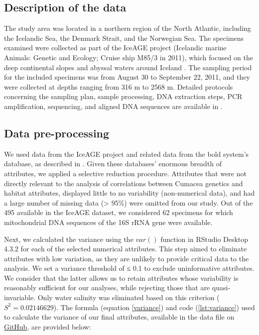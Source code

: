 \subsection{Description of the data}
The study area was located in a northern region of the North Atlantic, including the Icelandic Sea, the Denmark Strait, and the Norwegian Sea. The specimens examined were collected as part of the IceAGE project (Icelandic marine Animals: Genetic and Ecology; Cruise ship M85/3 in 2011), which focused on the deep continental slopes and abyssal waters around Iceland \citep{meisner_prefacebiodiversity_2018}. The sampling period for the included specimens was from August 30 to September 22, 2011, and they were collected at depths ranging from 316 m to 2568 m. Detailed protocols concerning the sampling plan, sample processing, DNA extraction steps, PCR amplification, sequencing, and aligned DNA sequences are available in \citep{uhlir_adding_2021}.

\subsection{Data pre-processing}
We used data from the IceAGE project and related data from the bold system's database, as described in \citep{uhlir_adding_2021}. Given these databases' enormous breadth of attributes, we applied a selective reduction procedure. Attributes that were not directly relevant to the analysis of correlations between Cumacea genetics and habitat attributes, displayed little to no variability (non-numerical data), and had a large number of missing data (> 95\%) were omitted from our study. Out of the 495 available in the IceAGE dataset, we considered 62 specimens for which mitochondrial DNA sequences of the 16S rRNA gene were available. 

Next, we calculated the variance using the $var()$ function in RStudio Desktop 4.3.2 for each of the selected numerical attributes. This step aimed to eliminate attributes with low variation, as they are unlikely to provide critical data to the analysis. We set a variance threshold of ≤ 0.1 to exclude uninformative attributes. We consider that the latter allows us to retain attributes whose variability is reasonably sufficient for our analyses, while rejecting those that are quasi-invariable. Only water salinity was eliminated based on this criterion ($S^2 = 0.02146629$). The formula (equation \ref{variance}) and code (\autoref{lst:variance}) used to calculate the variance of our final attributes, available in the data file on \href{https://github.com/tahiri-lab/Cumacea_aPhyloGeo}{GitHub}, are provided below:

